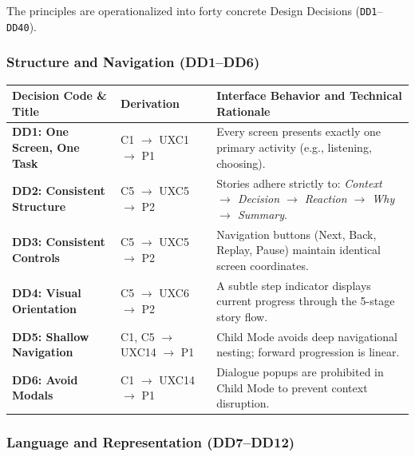 The principles are operationalized into forty concrete Design Decisions (\texttt{DD1}--\texttt{DD40}).

\subsubsection{Structure and Navigation (DD1--DD6)}

\begin{xltabular}{\textwidth}{|p{3.5cm}|p{2.5cm}|X|}
\hline
\textbf{Decision Code \& Title} & \textbf{Derivation} & \textbf{Interface Behavior and Technical Rationale} \\ \hline
\endhead
\textbf{DD1: One Screen, One Task} & C1 $\rightarrow$ UXC1 $\rightarrow$ P1 & Every screen presents exactly one primary activity (e.g., listening, choosing). \\ \hline
\textbf{DD2: Consistent Structure} & C5 $\rightarrow$ UXC5 $\rightarrow$ P2 & Stories adhere strictly to: \textit{Context $\rightarrow$ Decision $\rightarrow$ Reaction $\rightarrow$ Why $\rightarrow$ Summary}. \\ \hline
\textbf{DD3: Consistent Controls} & C5 $\rightarrow$ UXC5 $\rightarrow$ P2 & Navigation buttons (Next, Back, Replay, Pause) maintain identical screen coordinates. \\ \hline
\textbf{DD4: Visual Orientation} & C5 $\rightarrow$ UXC6 $\rightarrow$ P2 & A subtle step indicator displays current progress through the 5-stage story flow. \\ \hline
\textbf{DD5: Shallow Navigation} & C1, C5 $\rightarrow$ UXC14 $\rightarrow$ P1 & Child Mode avoids deep navigational nesting; forward progression is linear. \\ \hline
\textbf{DD6: Avoid Modals} & C1 $\rightarrow$ UXC14 $\rightarrow$ P1 & Dialogue popups are prohibited in Child Mode to prevent context disruption. \\ \hline
\end{xltabular}
\label{tab:c5_dd_nav}

\subsubsection{Language and Representation (DD7--DD12)}

